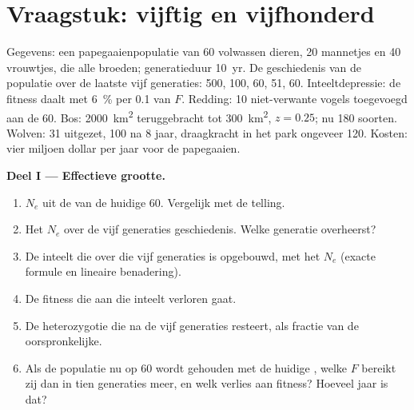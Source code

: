 \section{Vraagstuk: vijftig en vijfhonderd}

\begin{problem}
\label{pb:b3:conservation-biology:1}
Gegevens: een papegaaienpopulatie van 60 volwassen dieren, 20 mannetjes
en 40 vrouwtjes, die alle broeden; generatieduur \qty{10}{yr}. De
geschiedenis van de populatie over de laatste vijf generaties: 500,
100, 60, 51, 60. Inteeltdepressie: de fitness daalt met \qty{6}{\%} per
\qty{0.1}{} van $F$. Redding: 10 niet-verwante vogels toegevoegd aan de
60. Bos: \qty{2000}{km^2} teruggebracht tot \qty{300}{km^2}, $z = 0.25$;
nu 180 soorten. Wolven: 31 uitgezet, 100 na 8 jaar, draagkracht in het
park ongeveer 120. Kosten: vier miljoen dollar per jaar voor de
papegaaien.

\medskip
\noindent\textbf{Deel I --- Effectieve grootte.}
\begin{enumerate}
  \item $N_{e}$ uit de  van de huidige 60. Vergelijk
        met de telling.
  \item Het  $N_{e}$ over de vijf generaties
        geschiedenis. Welke generatie overheerst?
  \item De inteelt die over die vijf generaties is opgebouwd, met het
         $N_{e}$ (exacte formule en lineaire benadering).
  \item De fitness die aan die inteelt verloren gaat.
  \item De heterozygotie die na de vijf generaties resteert, als
        fractie van de oorspronkelijke.
  \item Als de populatie nu op 60 wordt gehouden met de huidige
        , welke $F$ bereikt zij dan in tien
        generaties meer, en welk verlies aan fitness? Hoeveel jaar is dat?
\end{enumerate}


\end{problem}
